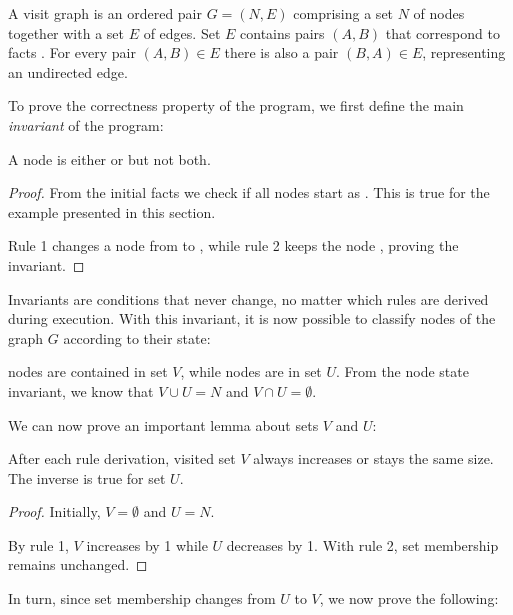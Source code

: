 \begin{definition}
A visit graph is an ordered pair $G = (N, E)$ comprising a set $N$ of nodes together
with a set $E$ of edges. Set $E$ contains pairs $(A, B)$ that correspond to
facts . For every pair $(A, B) \in E$ there is also a
pair $(B, A) \in E$, representing an undirected edge.
\end{definition}

To prove the correctness property of the program, we first define the main
\emph{invariant} of the program:

\begin{invariant}
A node is either  or  but not both.
\end{invariant}
\begin{proof}
From the initial facts we check if all nodes start as . This is
true for the example presented in this section.

Rule 1 changes a node from  to , while rule 2
keeps the node , proving the invariant.
\end{proof}

Invariants are conditions that never change, no matter which rules are derived
during execution. With this invariant, it is now possible to classify nodes of
the graph $G$ according to their state:

\begin{definition}  nodes are contained in set $V$,
while  nodes are in set $U$. From the node state invariant, we
know that $V \cup U = N$ and $V \cap U = \emptyset$.
\end{definition}

We can now prove an important lemma about sets $V$ and $U$:

\begin{invariant}

After each rule derivation, visited set $V$ always increases or stays the same
size. The inverse is true for set $U$.

\end{invariant}
\begin{proof}
Initially, $V = \emptyset$ and $U = N$.

By rule 1, $V$ increases by 1 while $U$ decreases by 1. With rule 2, set
membership remains unchanged.
\end{proof}

In turn, since set membership changes from $U$ to $V$, we now prove the
following:

